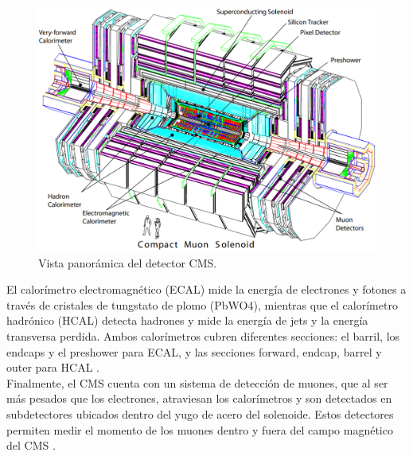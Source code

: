 \begin{center}
  \begin{figure}[ht]
    \centering
    \includegraphics[scale=.3]{Chapter2/CMS_detector_simple.png}
    \caption[Vista panorámica del detector CMS]{Vista panorámica del detector CMS.}
    \label{detector_CMS}
  \end{figure}
\end{center}

El calorímetro electromagnético (ECAL) mide la energía de electrones y fotones a través de cristales de tungstato de plomo (PbWO4), mientras que el calorímetro hadrónico (HCAL) detecta hadrones y mide la energía de jets y la energía transversa perdida. Ambos calorímetros cubren diferentes secciones: el barril, los endcaps y el preshower para ECAL, y las secciones forward, endcap, barrel y outer para HCAL \cite{det_summary}.\\

Finalmente, el CMS cuenta con un sistema de detección de muones, que al ser más pesados que los electrones, atraviesan los calorímetros y son detectados en subdetectores ubicados dentro del yugo de acero del solenoide. Estos detectores permiten medir el momento de los muones dentro y fuera del campo magnético del CMS \cite{det_summary}.\\

